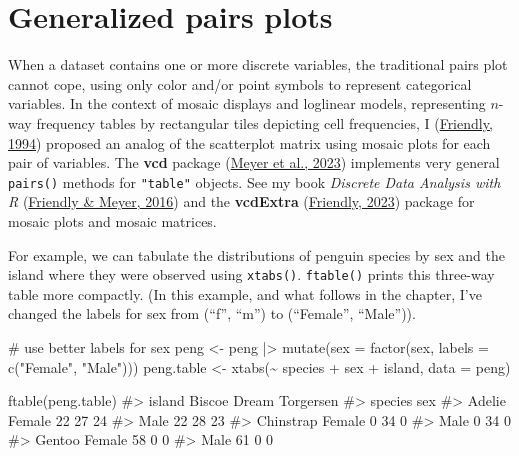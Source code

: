 \documentclass[
  letterpaper,
  10pt,
  krantz2]{krantz}
\makeatletter
\newenvironment{Shaded}{\begin{snugshade}}{\end{snugshade}}
\newcommand{\AttributeTok}[1]{\textcolor[rgb]{0.40,0.45,0.13}{#1}}
\newcommand{\CommentTok}[1]{\textcolor[rgb]{0.37,0.37,0.37}{#1}}
\newcommand{\FunctionTok}[1]{\textcolor[rgb]{0.28,0.35,0.67}{#1}}
\newcommand{\NormalTok}[1]{\textcolor[rgb]{0.00,0.23,0.31}{#1}}
\newcommand{\OtherTok}[1]{\textcolor[rgb]{0.00,0.23,0.31}{#1}}
\newcommand{\SpecialCharTok}[1]{\textcolor[rgb]{0.37,0.37,0.37}{#1}}
\newcommand{\StringTok}[1]{\textcolor[rgb]{0.13,0.47,0.30}{#1}}
\newenvironment{kframe}{%
  \medskip{}
  \setlength{\fboxsep}{.8em}
  \def\at@end@of@kframe{}%
  \ifinner\ifhmode%
  \def\at@end@of@kframe{\end{minipage}}%
  \begin{minipage}{\columnwidth}%
  \fi\fi%
  \def\FrameCommand##1{\hskip\@totalleftmargin \hskip-\fboxsep
  \colorbox{shadecolor}{##1}\hskip-\fboxsep
      \hskip-\linewidth \hskip-\@totalleftmargin \hskip\columnwidth}%
  \MakeFramed {\advance\hsize-\width
    \@totalleftmargin\z@ \linewidth\hsize
    \@setminipage}}%
{\par\unskip\endMakeFramed%
  \at@end@of@kframe}
\renewenvironment{Shaded}{\begin{kframe}}{\end{kframe}}
\makeatother
\begin{document}
\hypertarget{sec-ggpairs}{%
\section{Generalized pairs plots}\label{sec-ggpairs}}

When a dataset contains one or more discrete variables, the traditional
pairs plot cannot cope, using only color and/or point symbols to
represent categorical variables. In the context of mosaic displays and
loglinear models, representing \(n\)-way frequency tables by rectangular
tiles depicting cell frequencies, I
(\protect\hyperlink{ref-Friendly:94a}{Friendly, 1994}) proposed an
analog of the scatterplot matrix using mosaic plots for each pair of
variables. The \textbf{vcd} package (\protect\hyperlink{ref-R-vcd}{Meyer
et al., 2023}) implements very general \texttt{pairs()} methods for
\texttt{"table"} objects. See my book \emph{Discrete Data Analysis with
R} (\protect\hyperlink{ref-FriendlyMeyer:2016:DDAR}{Friendly \& Meyer,
2016}) and the \textbf{vcdExtra}
(\protect\hyperlink{ref-R-vcdExtra}{Friendly, 2023}) package for mosaic
plots and mosaic matrices.

For example, we can tabulate the distributions of penguin species by sex
and the island where they were observed using \texttt{xtabs()}.
\texttt{ftable()} prints this three-way table more compactly. (In this
example, and what follows in the chapter, I've changed the labels for
sex from (``f'', ``m'') to (``Female'', ``Male'')).

\begin{Shaded}
\begin{Highlighting}[]
\CommentTok{\# use better labels for sex}
\NormalTok{peng }\OtherTok{\textless{}{-}}\NormalTok{ peng }\SpecialCharTok{|\textgreater{}}
  \FunctionTok{mutate}\NormalTok{(}\AttributeTok{sex =} \FunctionTok{factor}\NormalTok{(sex, }\AttributeTok{labels =} \FunctionTok{c}\NormalTok{(}\StringTok{"Female"}\NormalTok{, }\StringTok{"Male"}\NormalTok{)))}
\NormalTok{peng.table }\OtherTok{\textless{}{-}} \FunctionTok{xtabs}\NormalTok{(}\SpecialCharTok{\textasciitilde{}}\NormalTok{ species }\SpecialCharTok{+}\NormalTok{ sex }\SpecialCharTok{+}\NormalTok{ island, }\AttributeTok{data =}\NormalTok{ peng)}

\FunctionTok{ftable}\NormalTok{(peng.table)}
\CommentTok{\#\textgreater{}                  island Biscoe Dream Torgersen}
\CommentTok{\#\textgreater{} species   sex                                 }
\CommentTok{\#\textgreater{} Adelie    Female            22    27        24}
\CommentTok{\#\textgreater{}           Male              22    28        23}
\CommentTok{\#\textgreater{} Chinstrap Female             0    34         0}
\CommentTok{\#\textgreater{}           Male               0    34         0}
\CommentTok{\#\textgreater{} Gentoo    Female            58     0         0}
\CommentTok{\#\textgreater{}           Male              61     0         0}
\end{Highlighting}
\end{Shaded}
\end{document}
